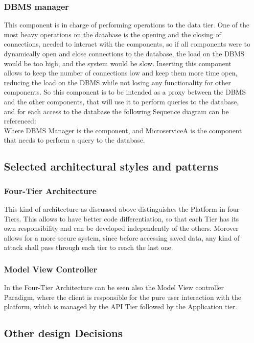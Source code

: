 \subsubsection{DBMS manager}
This component is in charge of performing operations to the data tier.
One of the most heavy operations on the database is the opening and the closing of connections, needed to interact with the components, so if all components were to dynamically open and close connections to the database, the load on the DBMS would be too high, and the system would be slow. 
Inserting this component allows to keep the number of connections low and keep them more time open, reducing the load on the DBMS while not losing any functionality for other components. 
So this component is to be intended as a proxy between the DBMS and the other components, that will use it to perform queries to the database, and for each access to the database the following Sequence diagram can be referenced:\\
Where DBMS Manager is the component, and MicroserviceA is the component that needs to perform a query to the database. 


\subsection{Selected architectural styles and patterns}
\subsubsection{Four-Tier Architecture}
This kind of architecture as discussed above distinguishes the Platform in four Tiers. 
This allows to have better code differentiation, so that each Tier has its own responsibility and can be developed independently of the others. 
Morover allows for a more secure system, since before accessing saved data, any kind of attack shall pass through each tier to reach the last one.
\subsubsection{Model View Controller}
In the Four-Tier Architecture can be seen also the Model View controller Paradigm, where the client is responsible for the pure user interaction with the platform, which is managed by the API Tier followed by the Application tier.
\subsection{Other design Decisions}

